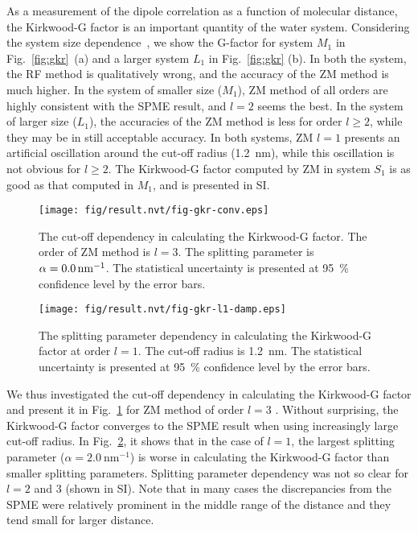\documentclass[a4paper,preprint,unsortedaddress,onecolumn,fleqn]{revtex4}
\begin{document}
As a measurement of the dipole correlation as a function of molecular
distance, the Kirkwood-G factor is an important quantity of the water
system. Considering the system size dependence~\cite{vanderSpoel2006origin},
we show the G-factor for system $M_{1}$ in Fig.~\ref{fig:gkr}~(a) and a
larger system $L_{1}$ in Fig.~\ref{fig:gkr} (b). In both the system, the RF
method is qualitatively wrong, and the accuracy of the ZM method is much
higher. In the system of smaller size ($M_{1}$), ZM method of all orders are
highly consistent with the SPME result, and $l=2$ seems the best. In the
system of larger size ($L_{1}$), the accuracies of the ZM method is less for
order $l\geq 2$, while they may be in still acceptable accuracy. In both
systems, ZM $l=1$ presents an artificial oscillation around the cut-off
radius (1.2~nm), while this oscillation is not obvious for $l\geq 2$. The
Kirkwood-G factor computed by ZM in system $S_{1}$ is as good as that
computed in $M_{1}$, and is presented in SI.

\begin{figure}[tbp]
\centering
\texttt{[image: fig/result.nvt/fig-gkr-conv.eps]}
\caption{ The cut-off dependency in calculating the Kirkwood-G factor. The
order of ZM method is $l=3$. The splitting parameter is $\protect\alpha %
=0.0\,\text{nm}^{-1}$. The statistical uncertainty is presented at 95~\%
confidence level by the error bars. }
\label{fig:gkr-conv}
\end{figure}

\begin{figure}[tbp]
\centering
\texttt{[image: fig/result.nvt/fig-gkr-l1-damp.eps]}
\caption{ The splitting parameter dependency in calculating the Kirkwood-G
factor at order $l=1$. The cut-off radius is 1.2~nm. The statistical
uncertainty is presented at 95~\% confidence level by the error bars. }
\label{fig:gkr-damp-l1}
\end{figure}

We thus investigated the cut-off dependency in calculating the Kirkwood-G
factor and present it in Fig.~\ref{fig:gkr-conv} for ZM method of order $l=3$%
. Without surprising, the Kirkwood-G factor converges to the SPME result
when using increasingly large cut-off radius. In Fig.~\ref{fig:gkr-damp-l1},
it shows that in the case of $l=1$, the largest splitting parameter ($\alpha
=2.0\ \text{nm}^{-1}$) is worse in calculating the Kirkwood-G factor than
smaller splitting parameters. Splitting parameter dependency was not so
clear for $l=2$ and 3 (shown in SI). Note that in many cases the
discrepancies from the SPME were relatively prominent in the middle range of
the distance and they tend small for larger distance.
\end{document}
